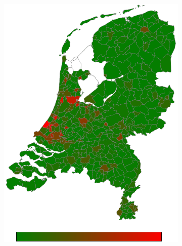 \documentclass[a4paper,twoside,11pt]{article}
\begin{document}
\begin{figure}[h]
\begin{subfigure}[b]{0.12\textwidth}
                \includegraphics[width=\textwidth]{Heatmaps/HeatMap4.png}
                \caption{}
                \label{fig:Density}
        \end{subfigure}
        \begin{subfigure}[b]{0.12\textwidth}

\end{subfigure}
\end{figure}
\end{document}
